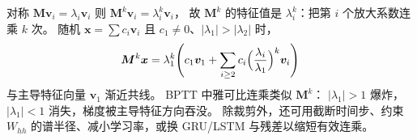 对称 $\bm{M}\bm{v}_i=\lambda_i\bm{v}_i$ 则 $\bm{M}^{k}\bm{v}_i=\lambda_i^{k}\bm{v}_i$，
故 $\bm{M}^{k}$ 的特征值是 $\lambda_i^{k}$：把第 $i$ 个放大系数连乘 $k$ 次。
随机 $\bm{x}=\sum c_i\bm{v}_i$ 且 $c_1\neq 0$、$|\lambda_1|>|\lambda_2|$ 时，
\[
\bm{M}^{k}\bm{x}
=\lambda_1^{k}\Biggl(c_1\bm{v}_1+\sum_{i\ge 2}c_i\Bigl(\frac{\lambda_i}{\lambda_1}\Bigr)^{k}\bm{v}_i\Biggr)
\]
与主导特征向量 $\bm{v}_1$ 渐近共线。
BPTT 中雅可比连乘类似 $\bm{M}^{k}$：
$|\lambda_1|>1$ 爆炸，$|\lambda_1|<1$ 消失，梯度被主导特征方向吞没。
除裁剪外，还可用截断时间步、约束 $W_{hh}$ 的谱半径、减小学习率，或换 GRU/LSTM 与残差以缩短有效连乘。
